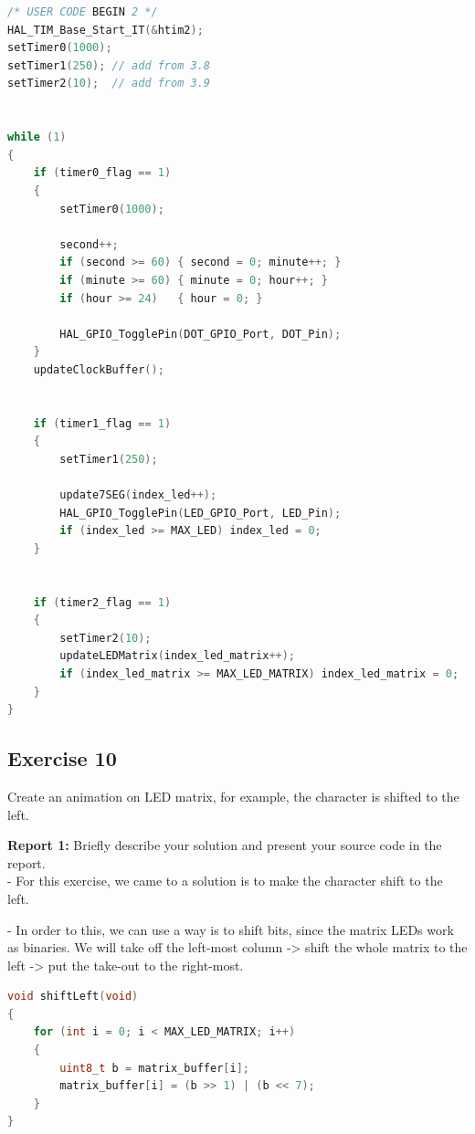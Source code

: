 \begin{lstlisting}[language=c,caption={Implementation for while loop}]
/* USER CODE BEGIN 2 */
HAL_TIM_Base_Start_IT(&htim2);
setTimer0(1000);
setTimer1(250); // add from 3.8
setTimer2(10);	// add from 3.9


while (1)
{
	if (timer0_flag == 1)
	{
		setTimer0(1000);

		second++;
		if (second >= 60) { second = 0; minute++; }
		if (minute >= 60) { minute = 0; hour++; }
		if (hour >= 24)   { hour = 0; }

		HAL_GPIO_TogglePin(DOT_GPIO_Port, DOT_Pin);
	}
	updateClockBuffer();


    if (timer1_flag == 1)
    {
        setTimer1(250);

        update7SEG(index_led++);
        HAL_GPIO_TogglePin(LED_GPIO_Port, LED_Pin);
        if (index_led >= MAX_LED) index_led = 0;
    }


    if (timer2_flag == 1)
    {
        setTimer2(10);
        updateLEDMatrix(index_led_matrix++);
        if (index_led_matrix >= MAX_LED_MATRIX) index_led_matrix = 0;
    }
}
\end{lstlisting}










\subsection{Exercise 10}
Create an animation on LED matrix, for example, the character is shifted to the left. 

\textbf{Report 1: } Briefly describe your solution and present your source code in the report.\\

- For this exercise, we came to a solution is to make the character shift to the left.

- In order to this, we can use a way is to shift bits, since the matrix LEDs work as binaries. We will take off the left-most column -> shift the whole matrix to the left -> put the take-out to the right-most.

\begin{lstlisting}[language=c,caption={Implementation for the shift bits function}]
void shiftLeft(void)
{
    for (int i = 0; i < MAX_LED_MATRIX; i++)
    {
        uint8_t b = matrix_buffer[i];
        matrix_buffer[i] = (b >> 1) | (b << 7);
    }
}
\end{lstlisting}

